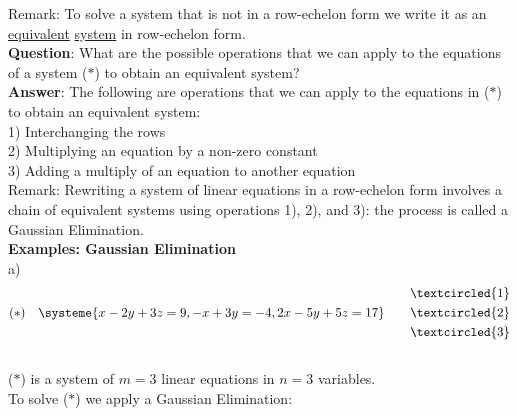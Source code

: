 \documentclass{jhwhw}
\begin{document}
Remark: To solve a system that is not in a row-echelon form we write it as an \underline{equivalent} \underline{system} in row-echelon form.
\\

\textbf{Question}: What are the possible operations that we can apply to the equations of a system (\(\ast\)) to obtain an equivalent system?
\\
\textbf{Answer}: The following are operations that we can apply to the equations in (\(\ast\)) to obtain an equivalent system:\\
1) Interchanging the rows \\
2) Multiplying an equation by a non-zero constant \\
3) Adding a multiply of an equation to another equation
\\

 Remark: Rewriting a system of linear equations in a row-echelon form involves a chain of equivalent systems using operations 1), 2), and 3): the process is called a Gaussian Elimination.
 \\

\textbf{Examples: Gaussian Elimination}
\\

a) \begin{align*} 
    (\ast) \quad \systeme{x-2y+3z=9, -x+3y=-4, 2x-5y+5z=17} \quad \quad \begin{aligned} &\textcircled{1} \\ &\textcircled{2} \\ &\textcircled{3}\end{aligned}
\end{align*}
\\
(\(\ast\)) is a system of \(m=3\) linear equations in \(n=3\) variables.
\\
To solve (\(\ast\)) we apply a Gaussian Elimination:
\\
\end{document}
